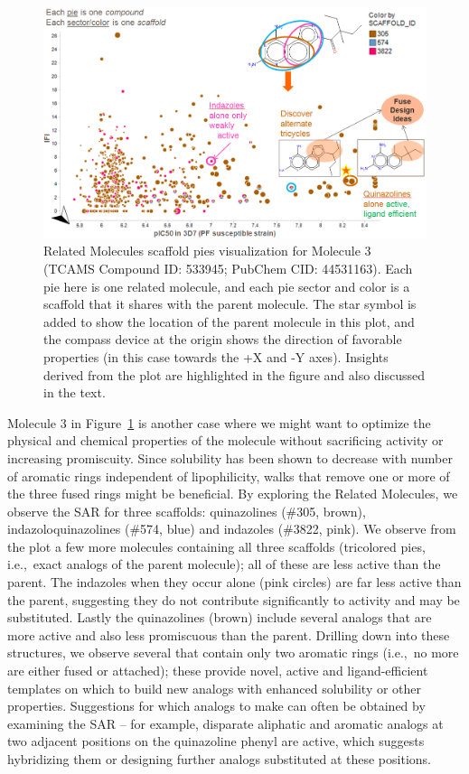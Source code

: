 \documentclass[journal=jacsat,manuscript=article]{achemso}
\newcommand*\fref[1]{Figure~\ref{fig:#1}}
\newcommand*\ie{i.e.,~}
\begin{document}
\begin{figure}
\includegraphics[width=6in]{fig/mol2_RGtool_scafpie2.png}
\caption{Related Molecules scaffold pies visualization for Molecule 3 (TCAMS Compound ID: 533945; PubChem CID: 44531163). Each pie here is one related molecule, and each pie sector and color is a scaffold that it shares with the parent molecule. The star symbol is added to show the location of the parent molecule in this plot, and the compass device at the origin shows the direction of favorable properties (in this case towards the +X and -Y axes). Insights derived from the plot are highlighted in the figure and also discussed in the text.}
\label{fig:scafwalk2}
\end{figure}

Molecule 3 in \fref{scafwalk2} is another case where we might want to optimize the physical and chemical properties of the molecule without sacrificing activity or increasing promiscuity. Since solubility has been shown to decrease with number of aromatic rings independent of lipophilicity\cite{Hill2010}, walks that remove one or more of the three fused rings might be beneficial. By exploring the Related Molecules, we observe the SAR for three scaffolds: quinazolines (\#305, brown), indazoloquinazolines (\#574, blue) and indazoles (\#3822, pink). We observe from the plot a few more molecules containing all three scaffolds (tricolored pies, \ie exact analogs of the parent molecule); all of these are less active than the parent. The indazoles when they occur alone (pink circles) are far less active than the parent, suggesting they do not contribute significantly to activity and may be substituted. Lastly the quinazolines (brown) include several analogs that are more active and also less promiscuous than the parent. Drilling down into these structures, we observe several that contain only two aromatic rings (\ie no more are either fused or attached); these provide novel, active and ligand-efficient templates on which to build new analogs with enhanced solubility or other properties. Suggestions for which analogs to make can often be obtained by examining the SAR -- for example, disparate aliphatic and aromatic analogs at two adjacent positions on the quinazoline phenyl are active, which suggests hybridizing them or designing further analogs substituted at these positions.
\end{document}
